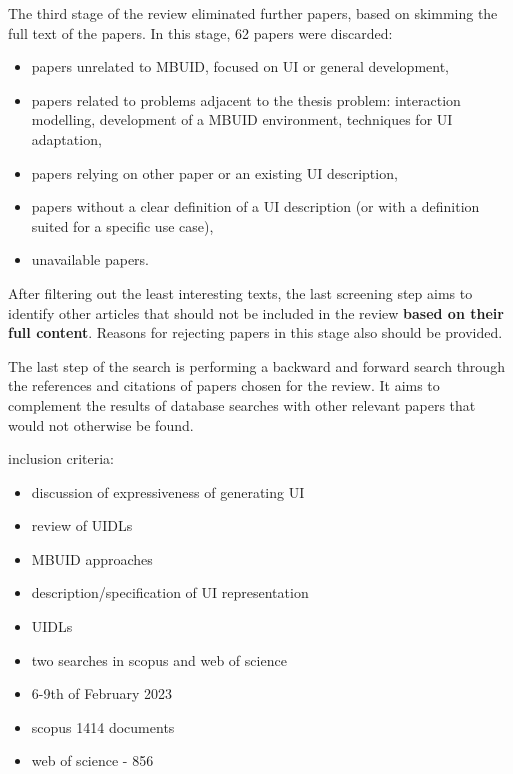 The third stage of the review eliminated further papers, based on skimming the full text of the papers.
In this stage, 62 papers were discarded:
\begin{itemize}
    \item papers unrelated to MBUID, focused on UI or general development,
    \item papers related to problems adjacent to the thesis problem: interaction modelling, development of a MBUID environment, techniques for UI adaptation,
    \item papers relying on other paper or an existing UI description,
    \item papers without a clear definition of a UI description (or with a definition suited for a specific use case),
    \item unavailable papers.
\end{itemize}

After filtering out the least interesting texts, the last screening step aims to identify other articles
that should not be included in the review \textbf{based on their full content}.
Reasons for rejecting papers in this stage also should be provided.

The last step of the search is performing a backward and forward search through the references and citations of papers chosen for the review.
It aims to complement the results of database searches with other relevant papers that would not otherwise be found.


inclusion criteria:
\begin{itemize}
    \item discussion of expressiveness of generating UI
    \item review of UIDLs
    \item MBUID approaches
    \item description/specification of UI representation
    \item UIDLs
\end{itemize}

\begin{itemize}
    \item two searches in scopus and web of science
    \item 6-9th of February 2023
    \item scopus 1414 documents
    \item web of science - 856
\end{itemize}

